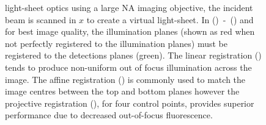 \begin{figure}
{    \gls{light-sheet} optics using a large \gls{NA} imaging objective, the incident beam is scanned in \(x\) to create a \gls{virtual light-sheet}.
    In ()~-~() and for best image quality, the illumination planes (shown as red when not perfectly registered to the illumination planes) must be registered to the detections planes (green).
    The linear registration () tends to produce non-uniform out of focus illumination across the image.
    The affine registration () is commonly used to match the image centres between the top and bottom planes however the projective registration (), for four control points, provides superior performance due to decreased out-of-focus fluorescence.
    }\label{fig:homography/geometry}
\end{figure}

%


